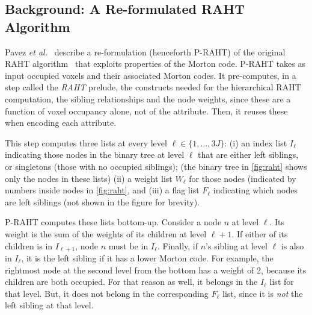 \subsection{Background: A Re-formulated RAHT Algorithm}\label{sec:backgr-fast-raht}


Pavez \textit{et al.}~\cite{raht} describe a re-formulation (henceforth P-RAHT) of the original RAHT algorithm~\cite{de2016compression} that exploits properties of the Morton code.
%
P-RAHT takes as input occupied voxels and their associated Morton codes.
%
It pre-computes, in a step called the \textit{RAHT} prelude, the constructs needed for the hierarchical RAHT computation, the sibling relationships and the node weights, since these are a function of voxel occupancy alone, not of the attribute.
%
Then, it reuses these when encoding each attribute.


%
This step computes three lists at every level $\ell \in \{1,\dots,3J\}$:
%
(i) an index list $I_\ell$ indicating those nodes in the binary tree at level $\ell$ that are either left siblings, or singletons (those with no occupied siblings); (the binary tree in \cref{fig:raht} shows only the nodes in these lists)
%
(ii) a weight list $W_\ell$ for those nodes (indicated by numbers inside nodes in \cref{fig:raht}, and
%
(iii) a flag list $F_\ell$ indicating which nodes are left siblings (not shown in the figure for brevity).

P-RAHT computes these lists bottom-up.
%
Consider a node $n$ at level $\ell$.
%
Its weight is the sum of the weights of its children at level $\ell+1$.
%
If either of its children is in $I_{\ell+1}$, node $n$ must be in $I_{\ell}$.
%
Finally, if $n$'s sibling at level $\ell$ is also in $I_{\ell}$, it is the left sibling if it has a lower Morton code.
%
For example, the rightmost node at the second level from the bottom has a weight of 2, because its children are both occupied.
%
For that reason as well, it belongs in the $I_\ell$ list for that level.
%
But, it does not belong in the corresponding $F_\ell$ list, since it is \textit{not} the left sibling at that level.

